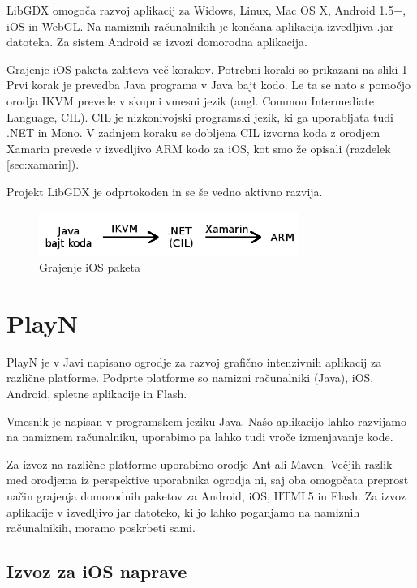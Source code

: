 LibGDX omogoča razvoj aplikacij za Widows, Linux, Mac OS X, Android 1.5+, iOS in WebGL. Na namiznih računalnikih je končana aplikacija izvedljiva .jar datoteka. Za sistem Android se izvozi domorodna aplikacija.

Grajenje iOS paketa zahteva več korakov. Potrebni koraki so prikazani na sliki \ref{libgdxss} Prvi korak je prevedba Java programa v Java bajt kodo. Le ta se nato s pomočjo orodja IKVM \cite{ikvm} prevede v skupni vmesni jezik (angl. Common Intermediate Language, CIL). CIL je nizkonivojski programski jezik, ki ga uporabljata tudi .NET in Mono. V zadnjem koraku se dobljena CIL izvorna koda z orodjem Xamarin prevede v izvedljivo ARM kodo za iOS, kot smo že opisali (razdelek \ref{sec:xamarin}).

Projekt LibGDX je odprtokoden in se še vedno aktivno razvija.

\begin{figure}
\begin{center}
\includegraphics[width=8.5cm]{pic/javabajt.png}
\end{center}
\caption{Grajenje iOS paketa}
\label{libgdxss}
\end{figure} 

\section{PlayN}
\label{sec:playn}
PlayN \cite{playn} je v Javi napisano ogrodje za razvoj grafično intenzivnih aplikacij za različne platforme. Podprte platforme so namizni računalniki (Java), iOS, Android, spletne aplikacije in Flash.

Vmesnik je napisan v programskem jeziku Java. Našo aplikacijo lahko razvijamo na namiznem računalniku, uporabimo pa lahko tudi vroče izmenjavanje kode. 

Za izvoz na različne platforme uporabimo orodje Ant ali Maven. Večjih razlik med orodjema iz perspektive uporabnika ogrodja ni, saj oba omogočata preprost način grajenja domorodnih paketov za Android, iOS, HTML5 in Flash. Za izvoz aplikacije v izvedljivo jar datoteko, ki jo lahko poganjamo na namiznih računalnikih, moramo poskrbeti sami.  

\subsection{Izvoz za iOS naprave}

